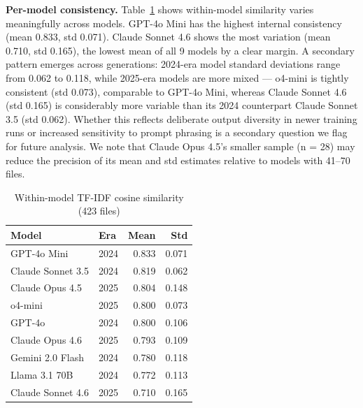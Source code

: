 \documentclass[sigconf]{acmart}
\begin{document}
\textbf{Per-model consistency.} Table~\ref{tab:similarity} shows within-model similarity varies meaningfully across models. GPT-4o Mini has the highest internal consistency (mean 0.833, std 0.071). Claude Sonnet 4.6 shows the most variation (mean 0.710, std 0.165), the lowest mean of all 9 models by a clear margin. A secondary pattern emerges across generations: 2024-era model standard deviations range from 0.062 to 0.118, while 2025-era models are more mixed --- o4-mini is tightly consistent (std 0.073), comparable to GPT-4o Mini, whereas Claude Sonnet 4.6 (std 0.165) is considerably more variable than its 2024 counterpart Claude Sonnet 3.5 (std 0.062). Whether this reflects deliberate output diversity in newer training runs or increased sensitivity to prompt phrasing is a secondary question we flag for future analysis. We note that Claude Opus 4.5's smaller sample (n = 28) may reduce the precision of its mean and std estimates relative to models with 41--70 files.

\begin{table}[h]
\caption{Within-model TF-IDF cosine similarity (423 files)}
\label{tab:similarity}
\begin{tabular}{llrr}
\toprule
Model & Era & Mean & Std \\
\midrule
GPT-4o Mini       & 2024 & 0.833 & 0.071 \\
Claude Sonnet 3.5 & 2024 & 0.819 & 0.062 \\
Claude Opus 4.5   & 2025 & 0.804 & 0.148 \\
o4-mini           & 2025 & 0.800 & 0.073 \\
GPT-4o            & 2024 & 0.800 & 0.106 \\
Claude Opus 4.6   & 2025 & 0.793 & 0.109 \\
Gemini 2.0 Flash  & 2024 & 0.780 & 0.118 \\
Llama 3.1 70B     & 2024 & 0.772 & 0.113 \\
Claude Sonnet 4.6 & 2025 & 0.710 & 0.165 \\
\bottomrule
\end{tabular}
\end{table}
\end{document}
